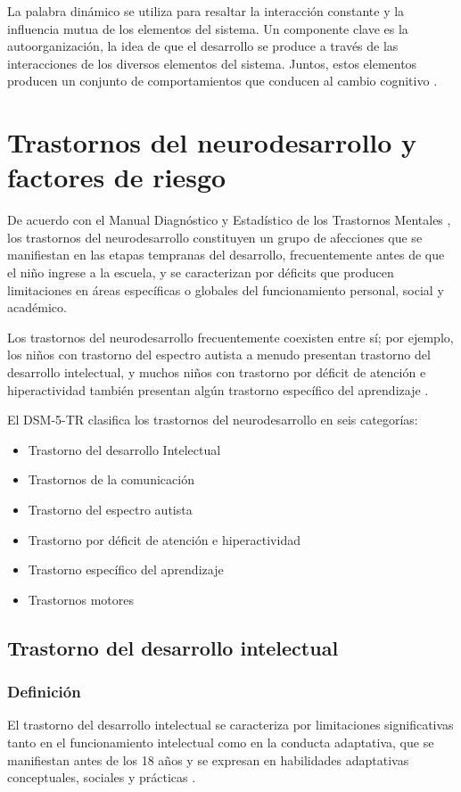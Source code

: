 La palabra dinámico se utiliza para resaltar la interacción constante y la
influencia mutua de los elementos del sistema. Un componente clave es la
autoorganización, la idea de que el desarrollo se produce a través de las
interacciones de los diversos elementos del sistema. Juntos, estos elementos
producen un conjunto de comportamientos que conducen al cambio cognitivo
\cite{Gauvain2022}.

\section{Trastornos del neurodesarrollo y factores de riesgo}
De acuerdo con el Manual Diagnóstico y Estadístico de los Trastornos Mentales
\cite{DSM5TR}, los trastornos del neurodesarrollo constituyen un grupo de 
afecciones que se manifiestan en las etapas tempranas del desarrollo, 
frecuentemente antes de que el niño ingrese a la escuela, y se caracterizan 
por déficits que producen limitaciones en áreas específicas o globales del
funcionamiento personal, social y académico.

Los trastornos del neurodesarrollo frecuentemente coexisten entre sí; por 
ejemplo, los niños con trastorno del espectro autista a menudo presentan 
trastorno del desarrollo intelectual, y muchos niños con trastorno por déficit
de atención e hiperactividad también presentan algún trastorno específico del
aprendizaje \cite{DSM5TR}.

El DSM-5-TR clasifica los trastornos del neurodesarrollo en seis categorías:
    \begin{itemize}
        \item Trastorno del desarrollo Intelectual
        \item Trastornos de la comunicación
        \item Trastorno del espectro autista
        \item Trastorno por déficit de atención e hiperactividad
        \item Trastorno específico del aprendizaje
        \item Trastornos motores
    \end{itemize}

\subsection{Trastorno del desarrollo intelectual}
\subsubsection{Definición}
El trastorno del desarrollo intelectual se caracteriza por limitaciones 
significativas tanto en el funcionamiento intelectual como en la conducta 
adaptativa, que se manifiestan antes de los 18 años y se expresan en 
habilidades adaptativas conceptuales, sociales y prácticas \cite{Simms2023}.

